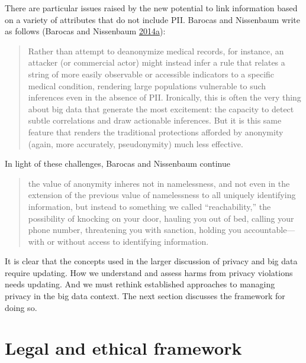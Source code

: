 \documentclass[]{krantz}
\begin{document}
There are particular issues raised by the new potential to link
information based on a variety of attributes that do not include PII.
Barocas and Nissenbaum write as follows (Barocas and Nissenbaum
\protect\hyperlink{ref-barocas2014big}{2014}\protect\hyperlink{ref-barocas2014big}{a}):

\begin{quote}
Rather than attempt to deanonymize medical records, for instance, an
attacker (or commercial actor) might instead infer a rule that relates a
string of more easily observable or accessible indicators to a specific
medical condition, rendering large populations vulnerable to such
inferences even in the absence of PII. Ironically, this is often the
very thing about big data that generate the most excitement: the
capacity to detect subtle correlations and draw actionable inferences.
But it is this same feature that renders the traditional protections
afforded by anonymity (again, more accurately, pseudonymity) much less
effective.
\end{quote}

In light of these challenges, Barocas and Nissenbaum continue

\begin{quote}
the value of anonymity inheres not in namelessness, and not even in the
extension of the previous value of namelessness to all uniquely
identifying information, but instead to something we called
``reachability,'' the possibility of knocking on your door, hauling you
out of bed, calling your phone number, threatening you with sanction,
holding you accountable---with or without access to identifying
information.
\end{quote}

It is clear that the concepts used in the larger discussion of privacy
and big data require updating. How we understand and assess harms from
privacy violations needs updating. And we must rethink established
approaches to managing privacy in the big data context. The next section
discusses the framework for doing so.

\section{Legal and ethical framework}\label{legal-and-ethical-framework}
\end{document}
